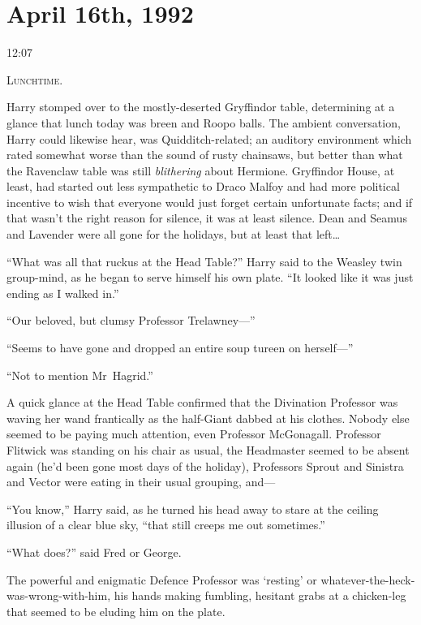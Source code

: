 
\section{April 16th, 1992}

12:07\pm

\lettrine{L}{unchtime.}

\hplettrineextrapara
Harry stomped over to the mostly-deserted Gryffindor table, determining at a glance that lunch today was breen and Roopo balls. The ambient conversation, Harry could likewise hear, was Quidditch-related; an auditory environment which rated somewhat worse than the sound of rusty chainsaws, but better than what the Ravenclaw table was still \emph{blithering} about Hermione. Gryffindor House, at least, had started out less sympathetic to Draco Malfoy and had more political incentive to wish that everyone would just forget certain unfortunate facts; and if that wasn’t the right reason for silence, it was at least silence. Dean and Seamus and Lavender were all gone for the holidays, but at least that left…

“What was all that ruckus at the Head Table?” Harry said to the Weasley twin group-mind, as he began to serve himself his own plate. “It looked like it was just ending as I walked in.”

“Our beloved, but clumsy Professor Trelawney—”

“Seems to have gone and dropped an entire soup tureen on herself—”

“Not to mention Mr~Hagrid.”

A quick glance at the Head Table confirmed that the Divination Professor was waving her wand frantically as the half-Giant dabbed at his clothes. Nobody else seemed to be paying much attention, even Professor McGonagall. Professor Flitwick was standing on his chair as usual, the Headmaster seemed to be absent again (he’d been gone most days of the holiday), Professors Sprout and Sinistra and Vector were eating in their usual grouping, and—

“You know,” Harry said, as he turned his head away to stare at the ceiling illusion of a clear blue sky, “that still creeps me out sometimes.”

“What does?” said Fred or George.

The powerful and enigmatic Defence Professor was ‘resting’ or whatever-the-heck-was-wrong-with-him, his hands making fumbling, hesitant grabs at a chicken-leg that seemed to be eluding him on the plate.

